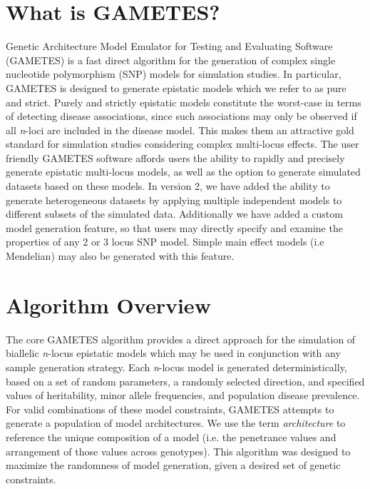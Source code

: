 \documentclass{report}
\begin{document}
\section{What is GAMETES?} 
Genetic Architecture Model Emulator for Testing and Evaluating Software (GAMETES) is a fast direct algorithm for the generation of complex single nucleotide polymorphism (SNP) models for simulation studies.  In particular, GAMETES is designed to generate epistatic models which we refer to as pure and strict.  Purely and strictly epistatic models constitute the worst-case in terms of detecting disease associations, since such associations may only be observed if all \emph{n}-loci are included in the disease model.  This makes them an attractive gold standard for simulation studies considering complex multi-locus effects.  The user friendly GAMETES software affords users the ability to rapidly and precisely generate epistatic multi-locus models, as well as the option to generate simulated datasets based on these models. In version 2, we have added the ability to generate heterogeneous datasets by applying multiple independent models to different subsets of the simulated data.  Additionally we have added a custom model generation feature, so that users may directly specify and examine the properties of any 2 or 3 locus SNP model. Simple main effect models (i.e Mendelian) may also be generated with this feature.

\section{Algorithm Overview} 
The core GAMETES algorithm provides a direct approach for the simulation of biallelic \emph{n}-locus epistatic models which may be used in conjunction with any sample generation strategy.  Each \emph{n}-locus model is generated deterministically, based on a set of random parameters, a randomly selected direction, and specified values of heritability, minor allele frequencies, and population disease prevalence.  For valid combinations of these model constraints, GAMETES attempts to generate a population of model architectures.  We use the term \emph{architecture} to reference the unique composition of a model (i.e. the penetrance values and arrangement of those values across genotypes).  This algorithm was designed to maximize the randomness of model generation, given a desired set of genetic constraints.
\end{document}
